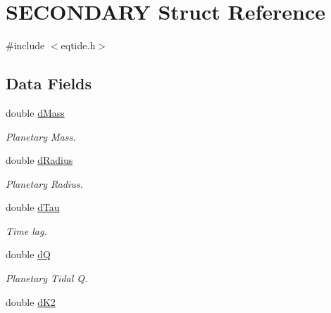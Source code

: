 \hypertarget{struct_s_e_c_o_n_d_a_r_y}{}\section{S\+E\+C\+O\+N\+D\+A\+R\+Y Struct Reference}
\label{struct_s_e_c_o_n_d_a_r_y}


{\ttfamily \#include $<$eqtide.\+h$>$}

\subsection*{Data Fields}
\begin{DoxyCompactItemize}
\item 
\hypertarget{struct_s_e_c_o_n_d_a_r_y_a46145abceab7ff393b42f976aadee93b}{}double \hyperlink{struct_s_e_c_o_n_d_a_r_y_a46145abceab7ff393b42f976aadee93b}{d\+Mass}\label{struct_s_e_c_o_n_d_a_r_y_a46145abceab7ff393b42f976aadee93b}

\begin{DoxyCompactList}\small\item\em Planetary Mass. \end{DoxyCompactList}\item 
\hypertarget{struct_s_e_c_o_n_d_a_r_y_ab22b6b0e1481933d96bc1ddef588f930}{}double \hyperlink{struct_s_e_c_o_n_d_a_r_y_ab22b6b0e1481933d96bc1ddef588f930}{d\+Radius}\label{struct_s_e_c_o_n_d_a_r_y_ab22b6b0e1481933d96bc1ddef588f930}

\begin{DoxyCompactList}\small\item\em Planetary Radius. \end{DoxyCompactList}\item 
\hypertarget{struct_s_e_c_o_n_d_a_r_y_ae05ab83b3156fbe7501266efefa5c541}{}double \hyperlink{struct_s_e_c_o_n_d_a_r_y_ae05ab83b3156fbe7501266efefa5c541}{d\+Tau}\label{struct_s_e_c_o_n_d_a_r_y_ae05ab83b3156fbe7501266efefa5c541}

\begin{DoxyCompactList}\small\item\em Time lag. \end{DoxyCompactList}\item 
\hypertarget{struct_s_e_c_o_n_d_a_r_y_a23df8c365c574c9229af210f2143b2a4}{}double \hyperlink{struct_s_e_c_o_n_d_a_r_y_a23df8c365c574c9229af210f2143b2a4}{d\+Q}\label{struct_s_e_c_o_n_d_a_r_y_a23df8c365c574c9229af210f2143b2a4}

\begin{DoxyCompactList}\small\item\em Planetary Tidal Q. \end{DoxyCompactList}\item 
\hypertarget{struct_s_e_c_o_n_d_a_r_y_ab740f60cd51c20b4e9412d72bed96d50}{}double \hyperlink{struct_s_e_c_o_n_d_a_r_y_ab740f60cd51c20b4e9412d72bed96d50}{d\+K2}\label{struct_s_e_c_o_n_d_a_r_y_ab740f60cd51c20b4e9412d72bed96d50}


\end{DoxyCompactItemize}
